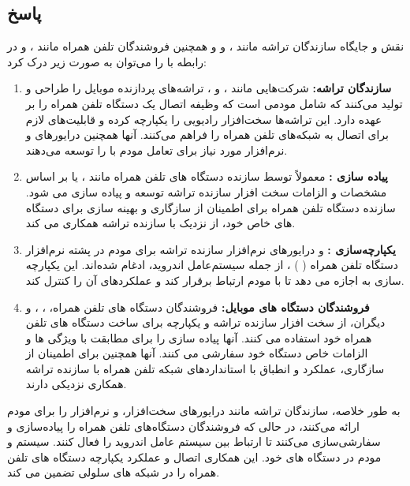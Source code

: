 \documentclass{report}
\begin{document}
\subsection*{پاسخ}
نقش و جایگاه سازندگان تراشه مانند
، 
و
 و همچنین فروشندگان تلفن همراه مانند
 ،
 و
  در رابطه با 
   را می‌توان به صورت زیر درک کرد:
\begin{enumerate}
	\item 
		\textbf{سازندگان تراشه:} 
		شرکت‌هایی مانند 
		، 
		و
		، تراشه‌های پردازنده موبایل را طراحی و تولید می‌کنند که شامل مودمی است که وظیفه اتصال 
		 یک دستگاه تلفن همراه را بر عهده دارد. این تراشه‌ها سخت‌افزار رادیویی را یکپارچه کرده و قابلیت‌های لازم برای اتصال به شبکه‌های تلفن همراه را فراهم می‌کنند. آنها همچنین درایورهای 
		  و نرم‌افزار مورد نیاز برای تعامل مودم با
		    را توسعه می‌دهند.
	\item 
	\textbf{پیاده سازی
	 :}
	 معمولاً توسط سازنده دستگاه های تلفن همراه مانند 
	 ،
	 یا
	  بر اساس مشخصات و الزامات سخت افزار سازنده تراشه توسعه و پیاده سازی می شود. سازنده دستگاه تلفن همراه برای اطمینان از سازگاری و بهینه سازی 
	   برای دستگاه های خاص خود، از نزدیک با سازنده تراشه همکاری می کند.
	   
	   \item 
	   \textbf{یکپارچه‌سازی
	    :}
	     و درایورهای نرم‌افزار سازنده تراشه برای مودم در پشته نرم‌افزار دستگاه تلفن همراه
	     (
	     )
	     ، از جمله سیستم‌عامل اندروید، ادغام شده‌اند. این یکپارچه سازی به 
	      اجازه می دهد تا با مودم ارتباط برقرار کند و عملکردهای آن را کنترل کند.
\item 
\textbf{فروشندگان دستگاه های موبایل:} 
فروشندگان دستگاه های تلفن همراه، 
،
،
 و دیگران، از سخت افزار سازنده تراشه و 
  یکپارچه برای ساخت دستگاه های تلفن همراه خود استفاده می کنند. آنها پیاده سازی
    را برای مطابقت با ویژگی ها و الزامات خاص دستگاه خود سفارشی می کنند. آنها همچنین برای اطمینان از سازگاری، عملکرد و انطباق با استانداردهای شبکه تلفن همراه با سازنده تراشه همکاری نزدیکی دارند.
\end{enumerate}

به طور خلاصه، سازندگان تراشه مانند درایورهای سخت‌افزار، 
 و نرم‌افزار را برای مودم ارائه می‌کنند، در حالی که فروشندگان دستگاه‌های تلفن همراه
   را پیاده‌سازی و سفارشی‌سازی می‌کنند تا ارتباط بین سیستم عامل اندروید را فعال کنند. سیستم و مودم در دستگاه های خود. این همکاری اتصال و عملکرد یکپارچه دستگاه های تلفن همراه را در شبکه های سلولی تضمین می کند.
\end{document}
